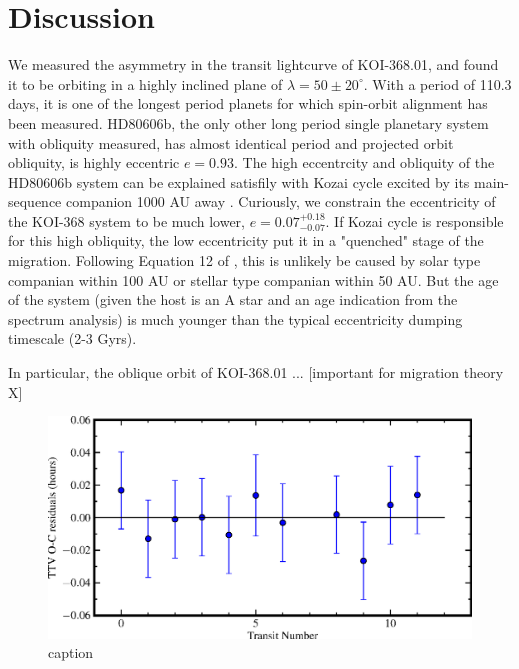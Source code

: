 \documentclass[preprint]{emulateapj}
\begin{document}
\section{Discussion}
\label{sec:discussion}

We measured the asymmetry in the transit lightcurve of KOI-368.01, and 
found it to be orbiting in a highly inclined plane of 
$\lambda = 50\pm20^\circ$. With a period of 110.3 days, it is one of the 
longest period planets for which spin-orbit alignment has been measured. 
HD80606b, the only other long period single planetary system 
with obliquity measured, has almost identical period and projected orbit 
obliquity, is highly eccentric $e=0.93$. The high eccentrcity and obliquity 
of the HD80606b system can be explained satisfily with Kozai cycle excited 
by its main-sequence companion 1000 AU away \citep{WuMurray:2003}. 
Curiously, we constrain the eccentricity of the KOI-368 system to be much 
lower, $e = 0.07^{+0.18}_{-0.07}$. If Kozai cycle is responsible for this 
high obliquity, the low eccentricity put it in a "quenched" stage of the 
migration. Following Equation 12 of \citet{Socrates:2012}, this is 
unlikely be caused by solar type companian within 100 AU or stellar type 
companian within 50 AU. 
But the age of the system (given the host is an A star 
and an age indication from the spectrum analysis) is much younger than 
the typical eccentricity dumping timescale (2-3 Gyrs).  


In particular, the oblique orbit of KOI-368.01 ... 
[important for migration theory X]



\begin{figure}
\includegraphics[width=0.9\linewidth]{TTV.eps}
\caption{caption
\label{fig:TTV}}
\end{figure}
\end{document}
